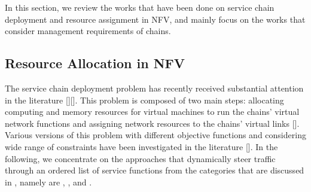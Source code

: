 In this section, we review the works that have been done on service chain deployment and resource assignment in NFV, and mainly focus on the works that consider management requirements of chains.


\subsection{Resource Allocation in NFV}



The service chain deployment problem has recently received substantial attention in the literature \cite{GilHerrera2016}[][]. This problem is composed of two main steps: allocating computing and memory resources for virtual machines to run the chains' virtual network functions and assigning network resources to the chains' virtual links []. 
Various versions of this problem with different objective functions and considering wide range of constraints have been investigated in the literature []. In the following, we concentrate on the approaches that dynamically steer traffic through an ordered list of service functions from the categories that are discussed in \cite{Laghrissi2019}, namely are , , and . 

